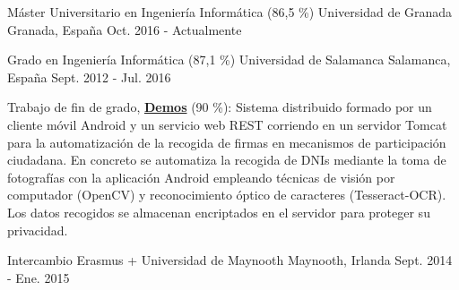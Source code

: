


\begin{cventries}


\cventry
{Máster Universitario en Ingeniería Informática (86,5 \%)} %
{Universidad de Granada} %
{Granada, España} %
{Oct. 2016 - Actualmente} %
{ }

\cventry
{Grado en Ingeniería Informática (87,1 \%)} %
{Universidad de Salamanca} %
{Salamanca, España} %
{Sept. 2012 - Jul. 2016} %
{ %
\begin{cvitems}
	\item {Trabajo de fin de grado, \href{https://github.com/AythaE/Demos_Rest}{\textbf{Demos}} (90 \%): Sistema distribuido formado por un cliente móvil Android y un servicio web REST corriendo en un servidor Tomcat para la automatización de la recogida de firmas en mecanismos de participación ciudadana. En concreto se automatiza la recogida de DNIs mediante la toma de fotografías con la aplicación Android empleando técnicas de visión por computador (OpenCV) y reconocimiento óptico de caracteres (Tesseract-OCR). Los datos recogidos se almacenan encriptados en el servidor para proteger su privacidad. \\}
\end{cvitems}
}	
\cventry
{Intercambio Erasmus +} %
{Universidad de Maynooth} %
{Maynooth, Irlanda} %
{Sept. 2014 - Ene. 2015} %
{ }
\end{cventries}
